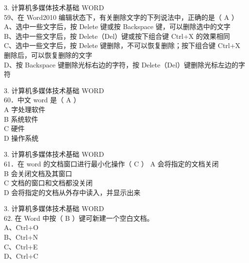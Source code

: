 \documentclass[aspectratio=169]{beamer}
\begin{document}
\begin{frame}[t]{3. 计算机多媒体技术基础} \vspace{20pt}
    WORD\\
59、在 Word2010 编辑状态下，有关删除文字的下列说法中，正确的是（ A ）\\
A、选中一些文字后，按 Delete 键或按 Backspace 键，可以删除选中的文字\\
B、选中一些文字后，按 Delete（Del）键或按下组合键 Ctrl+X 的效果相同\\
C、选中一些文字后，按 Delete 键删除，不可以恢复删除；按下组合键 Ctrl+X 删除后，可以恢复删除的文字\\
D、按 Backspace 键删除光标右边的字符，按 Delete（Del）键删除光标左边的字符\\
\end{frame}



\begin{frame}[t]{3. 计算机多媒体技术基础} \vspace{20pt}
    WORD\\

60．中文 word 是（ A ）\\
A 字处理软件\\ B 系统软件\\ C 硬件\\ D 操作系统\\
\end{frame}





\begin{frame}[t]{3. 计算机多媒体技术基础} \vspace{20pt}
    WORD\\
61．在 word 的文档窗口进行最小化操作（ C ）
A 会将指定的文档关闭\\
B 会关闭文档及其窗口\\
C 文档的窗口和文档都没关闭\\
D 会将指定的文档从外存中读入，并显示出来\\
\end{frame}


\begin{frame}[t]{3. 计算机多媒体技术基础} \vspace{20pt}
    WORD\\
62. 在 Word 中按（ B ）键可新建一个空白文档。\\
A、Ctrl+O\\ B、Ctrl+N\\
C、Ctrl+E\\ D、Ctrl+C\\
\end{frame}
\end{document}
